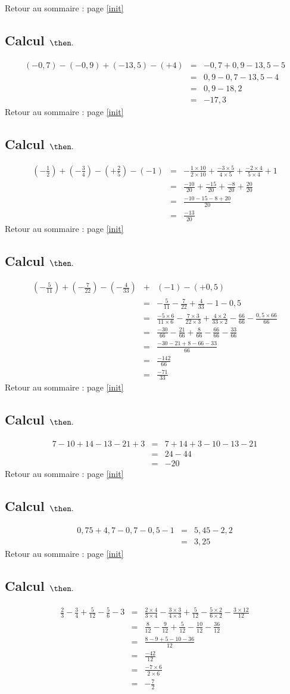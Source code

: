 \documentclass[14pt]{article}
\theoremstyle{remark}
\newcounter{n}
\renewcommand{\it}{Retour au sommaire : page \ref{init}
	\subsection{Calcul $ \mathbf{ \then}.$}\label{\then} \stepcounter{n} }
\theoremstyle{plain}
\begin{document}
\it \begin{eqnarray*} (-0,7)-(-0,9)+(-13,5)-(+4)&=& -0,7 +0,9 - 13,5 - 5\\
&=& 0,9 - 0,7-13,5-4 \\
&=& 0,9 - 18,2\\
&=& - 17,3\end{eqnarray*}
\it \begin{eqnarray*}\left(-\frac12\right)+\left(-\frac34\right) - \left(+\frac25\right)-(-1) &=& 
-\frac{1\times10}{2\times10}+\frac{-3\times5}{4\times5} + \frac{-2\times4}{5\times4} + 1 \\
&=& \frac{-10}{20} +\frac{-15}{20} + \frac{-8}{20} +\frac{20}{20} \\
&=& \frac{-10-15-8+20}{20}\\
&=& \frac{-13}{20}\end{eqnarray*}
\it \begin{eqnarray*}\left(-\frac5{11}\right)+\left(-\frac7{22}\right)
-\left(-\frac4{33}\right) &+& (-1) -(+0,5)\\
&=&
-\frac5{11}-\frac7{22}
+\frac4{33} -1 -0,5\\ 
&=&
 \frac{-5\times6}{11\times6} - \frac{7\times3}{22\times3} +\frac{4\times2}{33\times2} - \frac{66}{66} - \frac{0,5\times66}{66} \\
&=& \frac{-30}{66}-\frac{21}{66}+\frac8{66}-\frac{66}{66}-\frac{33}{66}\\
&=& \frac{-30-21+8-66-33}{66}\\
&=& \frac{-142}{66} \\ 
&=& \frac{-71}{33}
 \end{eqnarray*}
\it \begin{eqnarray*} 7-10+14-13-21+3 &=& 7 + 14 + 3 - 10 - 13 -21 \\
&=& 24 - 44 \\ &=& -20\end{eqnarray*}
\it \begin{eqnarray*}
0,75+4,7-0,7-0,5-1 &=& 5,45 - 2,2 \\ 
&=& 3,25
\end{eqnarray*}
\it \begin{eqnarray*}
\frac23-\frac34+\frac5{12}-\frac56 - 3 & = &
\frac{2\times4}{3\times4} - \frac{3\times3}{4\times3}
+\frac5{12} -\frac{5\times2}{6\times2} - \frac{3\times12}{12}\\
&=& \frac{8}{12}-\frac9{12} + \frac5{12} -\frac{10}{12} - \frac{36}{12}\\
&=& \frac{8-9+5-10-36}{12}\\
&=& \frac{-42}{12}\\
&=& \frac{-7\times6}{2\times6}\\
&=& -\frac72
\end{eqnarray*}
\end{document}
